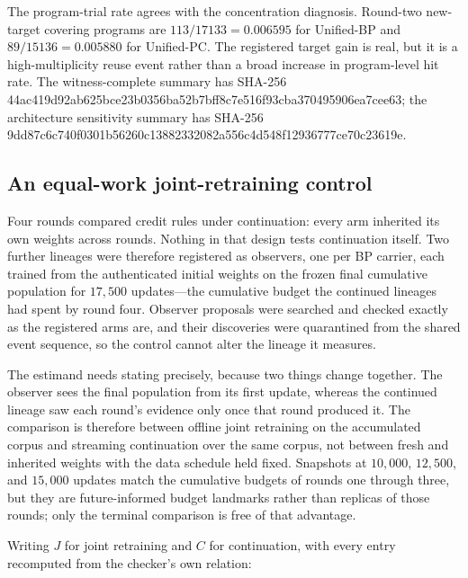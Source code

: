 \documentclass[11pt]{article}
\begin{document}
The program-trial rate agrees with the concentration diagnosis. Round-two new-target
covering programs are $113/17133=0.006595$ for Unified-BP and
$89/15136=0.005880$ for Unified-PC. The registered target gain is real, but it is a
high-multiplicity reuse event rather than a broad increase in program-level hit rate.
The witness-complete summary has SHA-256
{\scriptsize\ttfamily
44ac419d92ab625bce23b0356ba52b7bff8c7e516f93cba370495906ea7cee63};
the architecture sensitivity summary has SHA-256
{\scriptsize\ttfamily
9dd87c6c740f0301b56260c13882332082a556c4d548f12936777ce70c23619e}.

\subsection{An equal-work joint-retraining control}
\label{sec:joint-retraining-control}

Four rounds compared credit rules under continuation: every arm inherited its own weights
across rounds. Nothing in that design tests continuation itself. Two further lineages were
therefore registered as observers, one per BP carrier, each trained from the authenticated
initial weights on the frozen final cumulative population for $17{,}500$ updates---the
cumulative budget the continued lineages had spent by round four. Observer proposals were
searched and checked exactly as the registered arms are, and their discoveries were
quarantined from the shared event sequence, so the control cannot alter the lineage it
measures.

The estimand needs stating precisely, because two things change together. The observer
sees the final population from its first update, whereas the continued lineage saw each
round's evidence only once that round produced it. The comparison is therefore between
offline joint retraining on the accumulated corpus and streaming continuation over the
same corpus, not between fresh and inherited weights with the data schedule held fixed.
Snapshots at $10{,}000$, $12{,}500$, and $15{,}000$ updates match the cumulative budgets
of rounds one through three, but they are future-informed budget landmarks rather than
replicas of those rounds; only the terminal comparison is free of that advantage.

Writing $J$ for joint retraining and $C$ for continuation, with every entry recomputed
from the checker's own relation:
\end{document}
